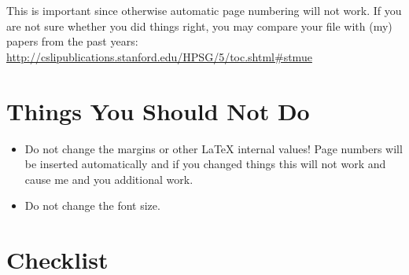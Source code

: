 \documentclass[11pt,a4paper,fleqn]{article}
\begin{document}
This is important since otherwise automatic page numbering will not work.
If you are not sure whether you did things right, you may compare your file
with (my) papers from the past years:\newline 
\url{http://cslipublications.stanford.edu/HPSG/5/toc.shtml#stmue}

\section{Things You Should Not Do}

\begin{itemize}
\item Do not change the margins or other \LaTeX{} internal values! Page numbers will be inserted automatically and
      if you changed things this will not work and cause me and you additional work.
\item Do not change the font size.
\end{itemize}


\section{Checklist}
\end{document}
